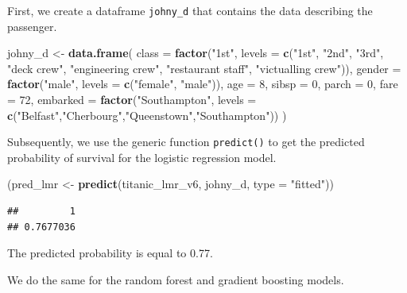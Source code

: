 \documentclass[12pt,]{krantz}
\newenvironment{Shaded}{\begin{snugshade}}{\end{snugshade}}
\newcommand{\DataTypeTok}[1]{\textcolor[rgb]{0.13,0.29,0.53}{#1}}
\newcommand{\DecValTok}[1]{\textcolor[rgb]{0.00,0.00,0.81}{#1}}
\newcommand{\KeywordTok}[1]{\textcolor[rgb]{0.13,0.29,0.53}{\textbf{#1}}}
\newcommand{\NormalTok}[1]{#1}
\newcommand{\StringTok}[1]{\textcolor[rgb]{0.31,0.60,0.02}{#1}}
\begin{document}
First, we create a dataframe \texttt{johny\_d} that contains the data describing the passenger.

\begin{Shaded}
\begin{Highlighting}[]
\NormalTok{johny\_d \textless{}{-}}\StringTok{ }\KeywordTok{data.frame}\NormalTok{(}
            \DataTypeTok{class =} \KeywordTok{factor}\NormalTok{(}\StringTok{"1st"}\NormalTok{, }\DataTypeTok{levels =} \KeywordTok{c}\NormalTok{(}\StringTok{"1st"}\NormalTok{, }\StringTok{"2nd"}\NormalTok{, }\StringTok{"3rd"}\NormalTok{, }\StringTok{"deck crew"}\NormalTok{, }\StringTok{"engineering crew"}\NormalTok{, }\StringTok{"restaurant staff"}\NormalTok{, }\StringTok{"victualling crew"}\NormalTok{)),}
            \DataTypeTok{gender =} \KeywordTok{factor}\NormalTok{(}\StringTok{"male"}\NormalTok{, }\DataTypeTok{levels =} \KeywordTok{c}\NormalTok{(}\StringTok{"female"}\NormalTok{, }\StringTok{"male"}\NormalTok{)),}
            \DataTypeTok{age =} \DecValTok{8}\NormalTok{,}
            \DataTypeTok{sibsp =} \DecValTok{0}\NormalTok{,}
            \DataTypeTok{parch =} \DecValTok{0}\NormalTok{,}
            \DataTypeTok{fare =} \DecValTok{72}\NormalTok{,}
            \DataTypeTok{embarked =} \KeywordTok{factor}\NormalTok{(}\StringTok{"Southampton"}\NormalTok{, }\DataTypeTok{levels =} \KeywordTok{c}\NormalTok{(}\StringTok{"Belfast"}\NormalTok{,}\StringTok{"Cherbourg"}\NormalTok{,}\StringTok{"Queenstown"}\NormalTok{,}\StringTok{"Southampton"}\NormalTok{))}
\NormalTok{)}
\end{Highlighting}
\end{Shaded}

Subsequently, we use the generic function \texttt{predict()} to get the predicted probability of survival for the logistic regression model.

\begin{Shaded}
\begin{Highlighting}[]
\NormalTok{(pred\_lmr \textless{}{-}}\StringTok{ }\KeywordTok{predict}\NormalTok{(titanic\_lmr\_v6, johny\_d, }\DataTypeTok{type =} \StringTok{"fitted"}\NormalTok{))}
\end{Highlighting}
\end{Shaded}

\begin{verbatim}
##         1 
## 0.7677036
\end{verbatim}

The predicted probability is equal to 0.77.

We do the same for the random forest and gradient boosting models.
\end{document}
